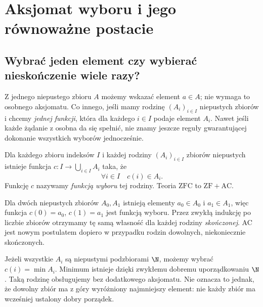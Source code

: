 \chapter{Aksjomat wyboru i jego równoważne postacie}\label{ch:axiom-choice}

\providecommand{\atlasref}[2]{#2}

\section{Wybrać jeden element czy wybierać nieskończenie wiele razy?}
Z jednego niepustego zbioru $A$ możemy wskazać element $a\in A$;
nie wymaga to osobnego aksjomatu. Co innego, jeśli mamy rodzinę
$(A_i)_{i\in I}$ niepustych zbiorów i chcemy \emph{jednej funkcji},
która dla każdego $i\in I$ podaje element $A_i$.
Nawet jeśli każde żądanie z osobna da się spełnić,
nie znamy jeszcze reguły gwarantującej dokonanie
wszystkich wyborów jednocześnie.

\begin{definicja}\label{def:choice}
Dla każdego zbioru indeksów $I$ i każdej rodziny
$(A_i)_{i\in I}$ zbiorów niepustych istnieje funkcja
$c:I\to\bigcup_{i\in I}A_i$ taka, że
\[
 \forall i\in I\quad c(i)\in A_i.
\]
Funkcję $c$ nazywamy \emph{funkcją wyboru} tej rodziny.
Teoria $\mathrm{ZFC}$ to $\mathrm{ZF}+\mathrm{AC}$.
\end{definicja}

\begin{przyklad}
Dla dwóch niepustych zbiorów $A_0,A_1$ istnieją elementy
$a_0\in A_0$ i $a_1\in A_1$, więc funkcja
$c(0)=a_0$, $c(1)=a_1$ jest funkcją wyboru.
Przez zwykłą indukcję po liczbie zbiorów otrzymamy tę samą
własność dla każdej rodziny \emph{skończonej}.
AC jest nowym postulatem dopiero w przypadku rodzin dowolnych,
niekoniecznie skończonych.
\end{przyklad}

\begin{przyklad}
Jeżeli wszystkie $A_i$ są niepustymi podzbiorami $\N$,
możemy wybrać $c(i)=\min A_i$. Minimum istnieje dzięki
zwykłemu dobremu uporządkowaniu $\N$.
Taką rodzinę obsługujemy bez dodatkowego aksjomatu.
Nie oznacza to jednak, że dowolny zbiór ma z góry
wyróżniony najmniejszy element: nie każdy zbiór ma
wcześniej ustalony dobry porządek.
\end{przyklad}

